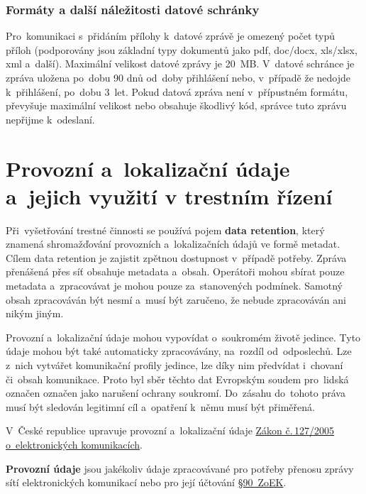 \subsubsection{Formáty a další náležitosti datové schránky}

Pro~komunikaci s~přidáním přílohy k~datové zprávě je omezený počet typů příloh (podporovány jsou základní typy dokumentů jako pdf, doc/docx, xls/xlsx, xml a~další). Maximální velikost datové zprávy je 20~MB. V~datové schránce je zpráva uložena po~dobu 90 dnů od~doby přihlášení nebo, v~případě že nedojde k~přihlášení, po~dobu 3~let. Pokud datová zpráva není v~přípustném formátu, převyšuje maximální velikost nebo obsahuje škodlivý kód, správce tuto zprávu nepřijme k~odeslaní.













\clearpage
\section{Provozní a~lokalizační údaje a~jejich využití v trestním řízení}

Při~vyšetřování trestné činnosti se používá pojem \textbf{data retention}, který znamená shromažďování provozních a~lokalizačních údajů ve formě metadat. Cílem data retention je zajistit zpětnou dostupnost v~případě potřeby. Zpráva přenášená přes síť obsahuje metadata a~obsah. Operátoři mohou sbírat pouze metadata a~zpracovávat je mohou pouze za~stanovených podmínek. Samotný obsah zpracováván být nesmí a~musí být zaručeno, že nebude zpracováván ani nikým jiným.

Provozní a~lokalizační údaje mohou vypovídat o~soukromém životě jedince. Tyto údaje mohou být také automaticky zpracovávány, na~rozdíl od~odposlechů. Lze z~nich vytvářet komunikační profily jedince, lze díky nim předvídat i~chovaní či~obsah komunikace. Proto byl sběr těchto dat Evropským soudem pro~lidská označen označen jako narušení ochrany soukromí. Do~zásahu do~tohoto práva musí být sledován legitimní cíl a~opatření k~němu musí být přiměřená.

V~České republice upravuje provozní a~lokalizační údaje \href{https://www.zakonyprolidi.cz/cs/2005-127}{Zákon č.\,127/2005 o~elektronických komunikacích}.

\textbf{Provozní údaje} jsou jakékoliv údaje zpracovávané pro potřeby přenosu zprávy sítí elektronických komunikací nebo pro její účtování \href{https://www.zakonyprolidi.cz/cs/2005-127#p90-1}{§90~ZoEK}.

